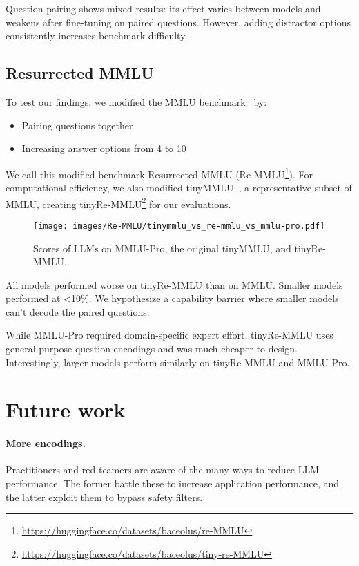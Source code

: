 \documentclass{article}
\begin{document}
Question pairing shows mixed results: its effect varies between models and weakens after fine-tuning on paired questions. However, adding distractor options consistently increases benchmark difficulty.

\subsection{Resurrected MMLU}

To test our findings, we modified the MMLU benchmark~\cite{mmlu} by:

\begin{itemize}[noitemsep]
    \item Pairing questions together
    \item Increasing answer options from 4 to 10
\end{itemize}

We call this modified benchmark Resurrected MMLU (Re-MMLU\footnote{\url{https://huggingface.co/datasets/baceolus/re-MMLU}}). For computational efficiency, we also modified tinyMMLU~\cite{tinymmlu}, a representative subset of MMLU, creating tinyRe-MMLU\footnote{\url{https://huggingface.co/datasets/baceolus/tiny-re-MMLU}} for our evaluations.


\begin{figure}[h]
    \centering
    \texttt{[image: images/Re-MMLU/tinymmlu\_vs\_re-mmlu\_vs\_mmlu-pro.pdf]}
    \caption{Scores of LLMs on MMLU-Pro, the original tinyMMLU, and tinyRe-MMLU.}
    \label{fig:Performance on tinyRe-MMLU}
\end{figure}

All models performed worse on tinyRe-MMLU than on MMLU. Smaller models performed at \textless10\%. We hypothesize a capability barrier where smaller models can't decode the paired questions.

While MMLU-Pro required domain-specific expert effort, tinyRe-MMLU uses general-purpose question encodings and was much cheaper to design. Interestingly, larger models perform similarly on tinyRe-MMLU and MMLU-Pro.

\section{Future work}

\paragraph{More encodings.} Practitioners and red-teamers are aware of the many ways to reduce LLM performance. The former battle these to increase application performance, and the latter exploit them to bypass safety filters.
\end{document}

